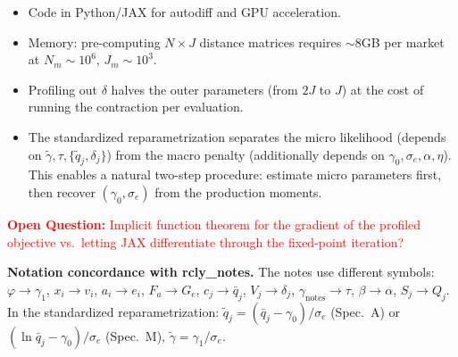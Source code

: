 \documentclass[11pt]{article}
\newcommand{\openq}[1]{\medskip\noindent\textcolor{red}{\textbf{Open Question:} #1}\medskip}
\begin{document}
\begin{itemize}
    \item Code in Python/JAX for autodiff and GPU acceleration.
    \item Memory: pre-computing $N\times J$ distance matrices requires $\sim$8GB per market at $N_m\sim 10^6$, $J_m\sim 10^3$.
    \item Profiling out $\delta$ halves the outer parameters (from $2J$ to $J$) at the cost of running the contraction per evaluation.
    \item The standardized reparametrization separates the micro likelihood (depends on $\tilde\gamma, \tau, \{\tilde q_j,\delta_j\}$) from the macro penalty (additionally depends on $\gamma_0, \sigma_e, \alpha, \eta$). This enables a natural two-step procedure: estimate micro parameters first, then recover $(\gamma_0,\sigma_e)$ from the production moments.
\end{itemize}

\openq{Implicit function theorem for the gradient of the profiled objective vs.\ letting JAX differentiate through the fixed-point iteration?}

\bigskip
\noindent\textbf{Notation concordance with rcly\_notes.} The notes use different symbols: $\varphi\to\gamma_1$,\; $x_i\to v_i$,\; $a_i\to e_i$,\; $F_a\to G_e$,\; $c_j\to\bar q_j$,\; $V_j\to\delta_j$,\; $\gamma_{\text{notes}}\to\tau$,\; $\beta\to\alpha$,\; $S_j\to Q_j$. In the standardized reparametrization: $\tilde q_j = (\bar q_j - \gamma_0)/\sigma_e$ (Spec.~A) or $(\ln\bar q_j - \gamma_0)/\sigma_e$ (Spec.~M), $\tilde\gamma = \gamma_1/\sigma_e$.
\end{document}
